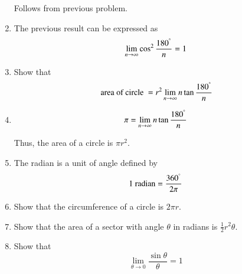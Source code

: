\begin{enumerate}[label=\arabic*.,ref=\thesubsection.\theenumi]
%
\solution  Follows from previous problem.
%
\item
	The previous result can be expressed as
%
\begin{equation}
\lim_{n \rightarrow \infty}\cos^2\frac{180^{\degree}}{n} = 1
\end{equation}
%	

\item
	Show that 
\begin{equation}
\text{ area of circle } = r^2\lim_{n \rightarrow \infty}
{n\tan\frac{180^{\degree}}{n}} 
\end{equation}	

%
\item
	\begin{equation}
	\pi = \lim_{n \rightarrow \infty}
	{n\tan\frac{180^{\degree}}{n}}
	\end{equation}

Thus, the area of a circle is $\pi r^2$.
\item
	The radian is a unit of angle defined by
\begin{equation}
	1 \text{ radian} = \frac{360^{\degree}}{2\pi}
\end{equation}

%
\item
	Show that the circumference of a circle is $2 \pi r$.

\item
	Show that the area of a sector with angle $\theta$ in radians is $\frac{1}{2}r^2\theta$.

\item
	Show that
	\begin{equation}
	\lim_{\theta \rightarrow 0} \frac{\sin\theta}{\theta} = 1
	\end{equation}

\end{enumerate}
